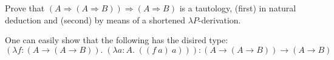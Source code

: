 \begin{problem}{5.6}
    Prove that $(A \Rightarrow (A \Rightarrow B)) \Rightarrow (A \Rightarrow B)$ is a tautology, (first) in natural deduction and (second) by means of a shortened $\lambda P$-derivation.
\end{problem}

\begin{solution}
    One can easily show that the following has the disired type:
    $$  (\lambda f : (A\to (A\to B)).\;(\lambda a : A.\;((f\ a)\ a))) : (A\to(A\to B)) \to (A\to B) $$
\end{solution}